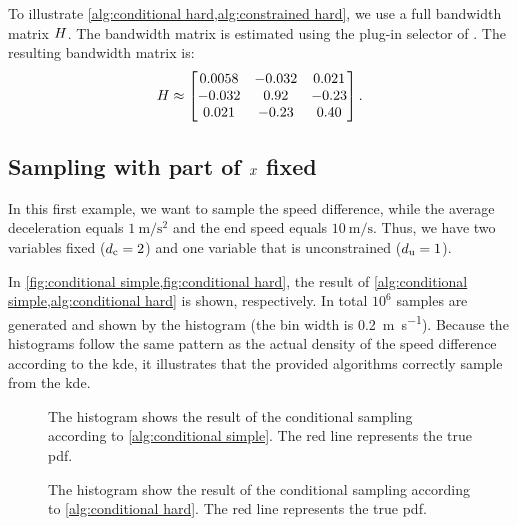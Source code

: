 To illustrate \cref{alg:conditional hard,alg:constrained hard}, we use a full bandwidth matrix $H$. 
The bandwidth matrix is estimated using the plug-in selector of \textcite{wand1994multivariate}. 
The resulting bandwidth matrix is:
\begin{equation*}
	H \approx
	\begin{bmatrix}
		0.0058 & -0.032 & 0.021 \\
		-0.032 & 0.92 & -0.23 \\
		0.021 & -0.23 & 0.40
	\end{bmatrix}.
\end{equation*}



\subsection{Sampling with part of $x$ fixed}

In this first example, we want to sample the speed difference, while the average deceleration equals $\SI{1}{\meter\per\second\squared}$ and the end speed equals $\SI{10}{\meter\per\second}$. 
Thus, we have two variables fixed ($d_\mathrm{c}=2$) and one variable that is unconstrained ($d_\mathrm{u}=1$).

In \cref{fig:conditional simple,fig:conditional hard}, the result of \cref{alg:conditional simple,alg:conditional hard} is shown, respectively. 
In total $10^6$ samples are generated and shown by the histogram (the bin width is \SI{0.2}{\meter\per\second}). 
Because the histograms follow the same pattern as the actual density of the speed difference according to the \ac{kde}, it illustrates that the provided algorithms correctly sample from the \ac{kde}. 

\begin{figure}
	\centering
	\resizebox{\columnwidth}{!}{%
		
	}
	\caption{The histogram shows the result of the conditional sampling according to \cref{alg:conditional simple}. The red line represents the true \ac{pdf}.}
	\label{fig:conditional simple}
\end{figure}

\begin{figure}
	\centering
	\resizebox{\columnwidth}{!}{%
		
	}
	\caption{The histogram show the result of the conditional sampling according to \cref{alg:conditional hard}. The red line represents the true \ac{pdf}.}
	\label{fig:conditional hard}
\end{figure}



